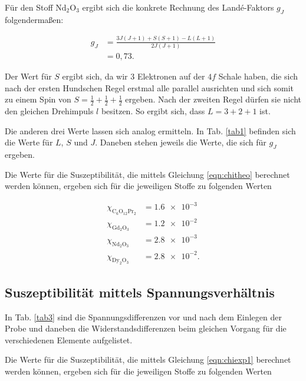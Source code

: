

\noindent Für den Stoff $\text{Nd}_2 \text{O}_3$ ergibt sich die konkrete Rechnung des Landé-Faktors $g_J$ folgendermaßen: 

\begin{align*}
    g_J &= \frac{3 J (J+1) + S (S+1) - L (L+1)}{2 J (J+1)} \\
        &= 0,73.
\end{align*} 

\noindent Der Wert für $S$ ergibt sich, da wir \num{3} Elektronen auf der $4f$ Schale haben, die sich nach der ersten Hundschen Regel erstmal alle parallel ausrichten und sich somit zu einem Spin von $S = \frac{1}{2}+ \frac{1}{2} + \frac{1}{2}$ ergeben. Nach der zweiten Regel dürfen sie nicht den gleichen Drehimpuls $l$ besitzen. So ergibt sich, dass $L = 3 + 2 + 1$ ist. 

\noindent Die anderen drei Werte lassen sich analog ermitteln. 
In Tab. \ref{tab1} befinden sich die Werte für $L$, $S$ und $J$. Daneben stehen jeweils die Werte, die sich für 
$g_J$ ergeben. 



\noindent Die Werte für die Suszeptibilität, die mittels Gleichung \eqref{eqn:chitheo} berechnet werden können, ergeben sich für die jeweiligen Stoffe 
zu folgenden Werten 

\begin{align*}
   \chi_{\text{C}_6 \text{O}_{12} \text{Pr}_2} &= \num{1.6e-3}\\
   \chi_{\text{Gd}_2 \text{O}_3} &= \num{1.2e-2}\\
   \chi_{\text{Nd}_2 \text{O}_3} &= \num{2.8e-3}\\
   \chi_{\text{Dy}_2 \text{O}_3} &= \num{2.8e-2}.
\end{align*}

\subsection{Suszeptibilität mittels Spannungsverhältnis}
In Tab. \ref{tab3} sind die Spannungsdifferenzen vor und nach dem Einlegen der Probe und daneben die Widerstandsdifferenzen beim gleichen Vorgang für die verschiedenen Elemente aufgelistet.


\noindent Die Werte für die Suszeptibilität, die mittels Gleichung \eqref{eqn:chiexp1} berechnet werden können, ergeben sich für die jeweiligen Stoffe 
zu folgenden Werten 

